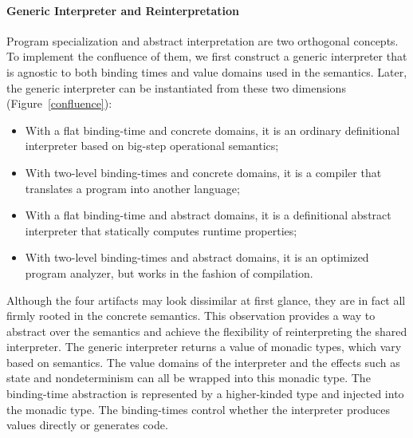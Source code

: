 \paragraph{Generic Interpreter and Reinterpretation}

Program specialization and abstract interpretation are two orthogonal
concepts.  To implement the confluence of them, we first construct a
generic interpreter that is agnostic to both binding times and value
domains used in the semantics.  Later, the generic interpreter can be
instantiated from these two dimensions (Figure~\ref{confluence}):
\begin{itemize}
\item With a flat binding-time and concrete domains, it is an ordinary
  definitional interpreter based on big-step operational semantics;
\item With two-level binding-times and concrete domains, it is a
  compiler that translates a program into another language;
\item With a flat binding-time and abstract domains, it is a
  definitional abstract interpreter \cite{DBLP:journals/pacmpl/DaraisLNH17}
  that statically computes runtime properties;
\item With two-level binding-times and abstract domains, it is an optimized
  program analyzer, but works in the fashion of compilation.
\end{itemize}

Although the four artifacts may look dissimilar at first glance, they are in
fact all firmly rooted in the concrete semantics.  This observation provides a
way to abstract over the semantics and achieve the flexibility of
reinterpreting the shared interpreter.  The generic interpreter returns a value
of monadic types, which vary based on semantics. The value domains
of the interpreter and the effects such as state and nondeterminism can all be
wrapped into this monadic type.  The binding-time abstraction is represented by
a higher-kinded type and injected into the monadic type.  The binding-times
control whether the interpreter produces values directly or generates code.


